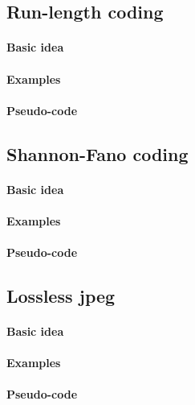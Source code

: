 \subsection{Run-length coding}
\paragraph*{Basic idea}
\paragraph*{Examples}
\paragraph*{Pseudo-code}

\subsection{Shannon-Fano coding}
\paragraph*{Basic idea}
\paragraph*{Examples}
\paragraph*{Pseudo-code}

\subsection{Lossless jpeg}
\paragraph*{Basic idea}
\paragraph*{Examples}
\paragraph*{Pseudo-code}
